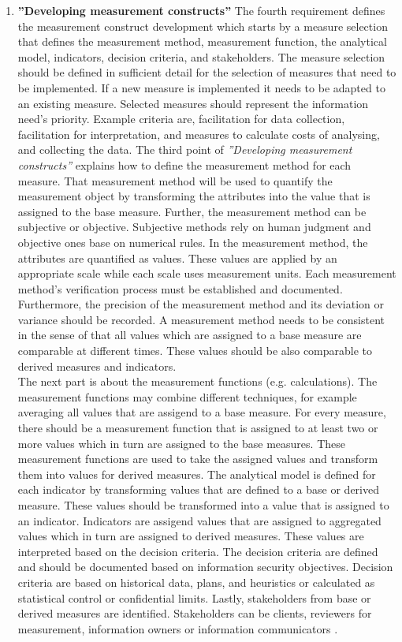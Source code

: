 \begin{enumerate}[label=(\alph*)]
  \item \label{itm:d} \textbf{''Developing measurement constructs''}
  The fourth requirement defines the measurement construct development which starts by a measure selection that defines the measurement method, measurement function, the analytical model, indicators, decision criteria, and stakeholders. The measure selection should be defined in sufficient detail for the selection of measures that need to be implemented. If a new measure is implemented it needs to be adapted to an existing measure. Selected measures should represent the information need's priority. Example criteria are, facilitation for data collection, facilitation for interpretation, and measures to calculate costs of analysing, and collecting the data. The third point of \textit{''Developing measurement constructs''} explains how to define the measurement method for each measure. That measurement method will be used to quantify the measurement object by transforming the attributes into the value that is assigned to the base measure. Further, the measurement method can be subjective or objective. Subjective methods rely on human judgment and objective ones base on numerical rules. In the measurement method, the attributes are quantified as values. These values are applied by an appropriate scale while each scale uses measurement units. Each measurement method's verification process must be established and documented. \\
  Furthermore, the precision of the measurement method and its deviation or variance should be recorded. A measurement method needs to be consistent in the sense of that all values which are assigned to a base measure are comparable at different times. These values should be also comparable to derived measures and indicators. \\
  The next part is about the measurement functions (e.g. calculations). The measurement functions may combine different techniques, for example averaging all values that are assigend to a base measure. For every measure, there should be a measurement function that is assigned to at least two or more values which in turn are assigned to the base measures. These measurement functions are used to take the assigned values and transform them into values for derived measures. The analytical model is defined for each indicator by transforming values that are defined to a base or derived measure. These values should be transformed into a value that is assigned to an indicator. Indicators are assigend values that are assigned to aggregated values which in turn are assigned to derived measures. These values are interpreted based on the decision criteria. The decision criteria are defined and should be documented based on information security objectives. Decision criteria are based on historical data, plans, and heuristics or calculated as statistical control or confidential limits. Lastly, stakeholders from base or derived measures are identified. Stakeholders can be clients, reviewers for measurement, information owners or information communicators \cite{ISO_27004_2009}. \\


\end{enumerate}
